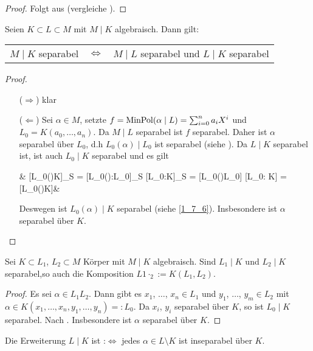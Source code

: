 \begin{proof}
	Folgt aus  (vergleiche ).
\end{proof}

\begin{conclusion}
	Seien $K\subset L\subset M$ mit $M\mid K$ algebraisch. Dann gilt: \begin{tabularx}{\linewidth}{X@{\quad}c@{\quad}X}
		\hfill $M\mid K$ separabel & $\Leftrightarrow$ & $M\mid L$ separabel und $L\mid K$ separabel
	\end{tabularx}
\end{conclusion}
\begin{proof}
	\leavevmode
	\begin{itemize}[topsep=-6pt]
		\item[($\Rightarrow$)] klar
		\item[($\Leftarrow$)] Sei $\alpha\in M$, setzte $f=\operatorname{MinPol}(\alpha\mid L) = \sum_{i=0}^n a_i X^i$ und $L_0 = K(a_0,\dots,a_n)$. Da $M\mid L$ separabel ist $f$ separabel. Daher ist $\alpha$ separabel über $L_0$, d.h $L_0(\alpha)\mid L_0$ ist separabel (siehe ). Da $L\mid K$ separabel ist, ist auch $L_0\mid K$ separabel und es gilt \begin{flalign*}
		\qquad & [L_0(\alpha)\mid K]_{\mathrm S} = [L_0(\alpha):L_0]_{\mathrm S} [L_0:K]_{\mathrm S} = [L_0(\alpha)\mid L_0] [L_0: K] = [L_0(\alpha)\mid K]&
	\end{flalign*}
	Deswegen ist $L_0(\alpha)\mid K$ separabel (siehe \cref{1_7_6}). Insbesondere ist $\alpha$ separabel über $K$.
	\end{itemize}
\end{proof}

\begin{conclusion}
Sei $K\subset L_1$, $L_2\subset M$ Körper mit $M\mid K$ algebraisch. Sind $L_1\mid K$ und $L_2\mid K$ separabel,so auch die Komposition $L1\cdot _2 := K(L_1,L_2)$.
\end{conclusion}
\begin{proof}
Es sei $\alpha\in L_1L_2$. Dann gibt es $x_1$, $\dots$, $x_n\in L_1$ und $y_1$, $\dots$, $y_m\in L_2$ mit $\alpha\in K(x_1,\dots,x_n,y_1,\dots,y_n) =: L_0$. Da $x_i$, $y_i$ separabel über $K$, so ist $L_0\mid K$ separabel. Nach . Insbesondere ist $\alpha$ separabel über $K$.
\end{proof}

\begin{definition}
Die Erweiterung $L\mid K$ ist  :$\Leftrightarrow$ jedes $\alpha\in L\setminus K$ ist inseparabel über $K$.
\end{definition}

